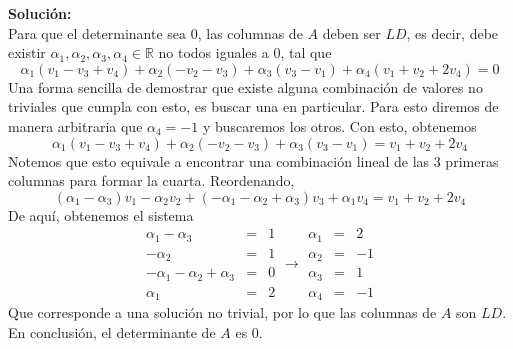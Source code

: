\documentclass[12pt]{article}
\newenvironment{solucion}
{\begin{mdframed}[backgroundcolor=black!10]
		{\bf Solución:}\\
	}
	{
	\end{mdframed}
}
\newenvironment{preguntas}
{\begin{enumerate}\itemsep12pt
	}
	{
	\end{enumerate}
}
\newcommand{\ra}{\rightarrow}
\newcommand{\R}{\mathbb{R}}
\begin{document}
\begin{preguntas}
\begin{solucion}
Para que el determinante sea 0, las columnas de $A$ deben ser $LD$, es decir, debe existir $\alpha_1, \alpha_2, \alpha_3, \alpha_4 \in \R$ no todos iguales a 0, tal que
$$\alpha_1(v_1-v_3+v_4) + \alpha_2(-v_2-v_3) +\alpha_3(v_3-v_1) + \alpha_4(v_1+v_2+2v_4) = 0$$
Una forma sencilla de demostrar que existe alguna combinación de valores no triviales que cumpla con esto, es buscar una en particular. Para esto diremos de manera arbitraria que $\alpha_4 = -1$ y buscaremos los otros. Con esto, obtenemos
$$\alpha_1(v_1-v_3+v_4) + \alpha_2(-v_2-v_3) +\alpha_3(v_3-v_1) =v_1+v_2+2v_4$$
Notemos que esto equivale a encontrar una combinación lineal de las 3 primeras columnas para formar la cuarta. Reordenando,
$$(\alpha_1 - \alpha_3)v_1 -\alpha_2 v_2 + (-\alpha_1 - \alpha_2 + \alpha_3)v_3 + \alpha_1 v_4 =v_1+v_2+2v_4$$
De aquí, obtenemos el sistema
$$\begin{array}{rcl}
\alpha_1 - \alpha_3 & = & 1\\
-\alpha_2 & = & 1\\
-\alpha_1 - \alpha_2 + \alpha_3 & = & 0\\
\alpha_1 & = & 2
\end{array} \ra
\begin{array}{rcl}
\alpha_1 & = & 2\\
\alpha_2 & = & -1\\
\alpha_3 & = & 1\\
\alpha_4 & = & -1
\end{array}
$$
Que corresponde a una solución no trivial, por lo que las columnas de $A$ son $LD$.\\

En conclusión, el determinante de $A$ es 0.
\end{solucion}
\end{preguntas}
\end{document}

